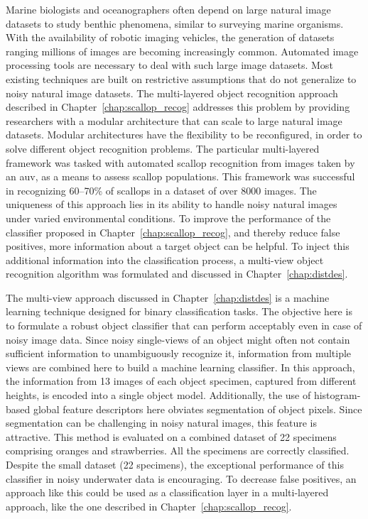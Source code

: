 \documentclass {udthesis}
\begin{document}
Marine biologists and oceanographers often depend on large natural image datasets to study benthic phenomena, similar to surveying marine organisms. With the availability of robotic imaging vehicles, the generation of datasets ranging millions of images are becoming increasingly common. Automated image processing tools are necessary to deal with such large image datasets. Most existing techniques are built on restrictive assumptions that do not generalize to noisy natural image datasets. The multi-layered object recognition approach described in Chapter~\ref{chap:scallop_recog} addresses this problem by providing researchers with a modular architecture that can scale to large natural image datasets. Modular architectures have the flexibility to be reconfigured, in order to solve different object recognition problems.
The particular multi-layered framework was tasked with automated scallop recognition from images taken by an \gls{auv}, as a means to assess scallop populations. 
This framework was successful in recognizing 60--70\% of scallops in a dataset of over 8000 images.
The uniqueness of this approach lies in its ability to handle noisy natural images under varied environmental conditions.
To improve the performance of the classifier proposed in Chapter~\ref{chap:scallop_recog}, and thereby reduce false positives, more information about a target object can be helpful.
To inject this additional information into the classification process, a multi-view object recognition algorithm was formulated and discussed in Chapter~\ref{chap:distdes}.

The multi-view approach discussed in Chapter~\ref{chap:distdes} is a machine learning 
technique designed for binary classification tasks. 
The objective here is to formulate a robust object classifier that can perform acceptably even in case of noisy image data.
Since noisy single-views of an object might often not contain sufficient information to unambiguously recognize it, information from multiple views are combined 
here to build a machine learning classifier. 
In this approach, the information from 13 images of each object specimen, captured from different heights, is encoded into a single object model.
Additionally, the use of histogram-based global feature descriptors here obviates segmentation of object pixels. Since segmentation can be challenging in noisy natural images, this feature is attractive. This method is evaluated on a combined dataset of 22 specimens comprising oranges and strawberries.
All the specimens are correctly classified. Despite the small dataset (22 specimens), the exceptional performance of this classifier in noisy underwater data is encouraging. To decrease false positives, an approach like this could be used as a classification layer in a multi-layered approach, like the one described in Chapter~\ref{chap:scallop_recog}.
\end{document}
